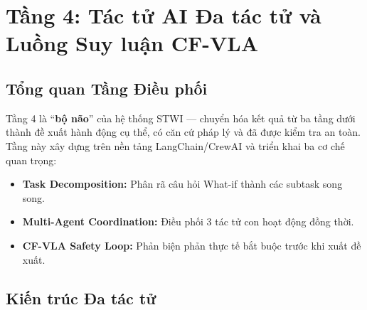 \chapter{Tầng 4: Tác tử AI Đa tác tử và Luồng Suy luận CF-VLA}

\section{Tổng quan Tầng Điều phối}

Tầng 4 là ``\textbf{bộ não}'' của hệ thống STWI --- chuyển hóa kết quả từ ba tầng dưới thành đề xuất hành động cụ thể, có căn cứ pháp lý và đã được kiểm tra an toàn. Tầng này xây dựng trên nền tảng LangChain/CrewAI và triển khai ba cơ chế quan trọng:

\begin{itemize}[itemsep=3pt]
  \item \textbf{Task Decomposition:} Phân rã câu hỏi What-if thành các subtask song song.
  \item \textbf{Multi-Agent Coordination:} Điều phối 3 tác tử con hoạt động đồng thời.
  \item \textbf{CF-VLA Safety Loop:} Phản biện phản thực tế bắt buộc trước khi xuất đề xuất.
\end{itemize}

\section{Kiến trúc Đa tác tử}

